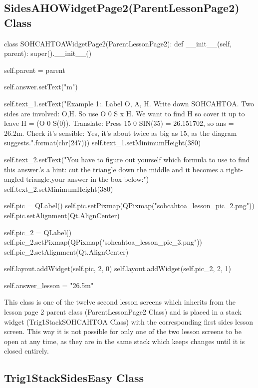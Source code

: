 \subsection{SidesAHOWidgetPage2(ParentLessonPage2) Class}

\begin{python}
class SOHCAHTOAWidgetPage2(ParentLessonPage2):
    def __init__(self, parent):
        super().__init__()
        
        self.parent = parent

        self.answer.setText("m")

        self.text_1.setText("Example 1:. Label O, A, H. Write down SOHCAHTOA. Two sides are involved: O,H. So use O {0} S x H. We want to find H so cover it up to leave H = (O {0} S(0)). Translate: Press 15 {0} SIN(35) = 26.151702, so ans = 26.2m. Check it's sensible: Yes, it's about twice as big as 15, as the diagram suggests.".format(chr(247)))
        self.text_1.setMinimumHeight(380)
        
        self.text_2.setText("You have to figure out yourself which formula to use to find this answer.\nHere's a hint: cut the triangle down the middle and it becomes a right-angled triangle.\n \n \n \n \n \n \nPut your answer in the box below:")      
        self.text_2.setMinimumHeight(380)

        self.pic = QLabel()
        self.pic.setPixmap(QPixmap("sohcahtoa_lesson_pic_2.png"))
        self.pic.setAlignment(Qt.AlignCenter)

        self.pic_2 = QLabel()
        self.pic_2.setPixmap(QPixmap("sohcahtoa_lesson_pic_3.png"))
        self.pic_2.setAlignment(Qt.AlignCenter)

        self.layout.addWidget(self.pic, 2, 0)
        self.layout.addWidget(self.pic_2, 2, 1)

        self.answer_lesson = "26.5m"
\end{python}

This class is one of the twelve second lesson screens which inherits from the lesson page 2 parent class (ParentLessonPage2 Class) and is placed in a stack widget (Trig1StackSOHCAHTOA Class) with the corresponding first sides lesson screen. This way it is not possible for only one of the two lesson screens to be open at any time, as they are in the same stack which keeps changes until it is closed entirely.

\subsection{Trig1StackSidesEasy Class}

